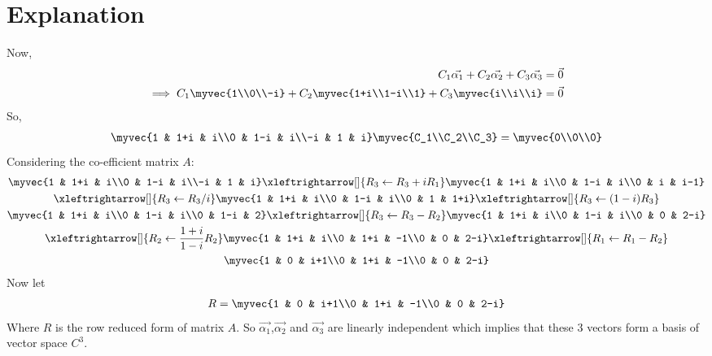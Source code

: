 \documentclass[journal,12pt,twocolumn]{IEEEtran}
\begin{document}
\section{Explanation}
Now,
\begin{align}
C_1 \vec{\alpha_1} +C_2 \vec{\alpha_2}+C_3 \vec{\alpha_3} = \vec{0}\\
\implies C_1 \myvec{1\\0\\-i}+ C_2\myvec{1+i\\1-i\\1} + C_3\myvec{i\\i\\i} = \vec{0}
\end{align}
So,
\begin{align}
\myvec{1 & 1+i & i\\0 & 1-i & i\\-i & 1 & i}\myvec{C_1\\C_2\\C_3} = \myvec{0\\0\\0}
\end{align}
Considering the co-efficient matrix $A$:
\begin{multline}
\myvec{1 & 1+i & i\\0 & 1-i & i\\-i & 1 & i}\xleftrightarrow[]{R_3\leftarrow R_3+iR_1}\myvec{1 & 1+i & i\\0 & 1-i & i\\0 & i & i-1}\\
\xleftrightarrow[]{R_3\leftarrow R_3/i}\myvec{1 & 1+i & i\\0 & 1-i & i\\0 & 1 & 1+i}\xleftrightarrow[]{R_3\leftarrow (1-i)R_3}\\
\myvec{1 & 1+i & i\\0 & 1-i & i\\0 & 1-i & 2}\xleftrightarrow[]{R_3\leftarrow R_3-R_2}\myvec{1 & 1+i & i\\0 & 1-i & i\\0 & 0 & 2-i}\\
\xleftrightarrow[]{R_2\leftarrow \frac{1+i}{1-i}R_2}\myvec{1 & 1+i & i\\0 & 1+i & -1\\0 & 0 & 2-i}\xleftrightarrow[]{R_1\leftarrow R_1-R_2}\\
\myvec{1 & 0 & i+1\\0 & 1+i & -1\\0 & 0 & 2-i}
\end{multline}
Now let 
\begin{align}
R = \myvec{1 & 0 & i+1\\0 & 1+i & -1\\0 & 0 & 2-i}
\end{align}
Where $R$ is the row reduced form of matrix $A$. So $\vec{\alpha_1}$,$\vec{\alpha_2}$ and $\vec{\alpha_3}$ are linearly independent which implies that these 3 vectors form a basis of vector space $C^3$.
\end{document}
